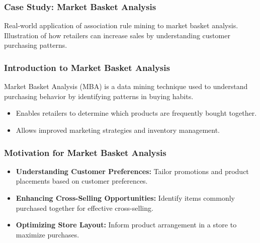 \documentclass[aspectratio=169]{beamer}
\begin{document}
\begin{frame}[fragile]
    \frametitle{Case Study: Market Basket Analysis}
    Real-world application of association rule mining to market basket analysis. 
    Illustration of how retailers can increase sales by understanding customer purchasing patterns.
\end{frame}

\begin{frame}[fragile]
    \frametitle{Introduction to Market Basket Analysis}
    Market Basket Analysis (MBA) is a data mining technique used to understand purchasing behavior by identifying patterns in buying habits.
    
    \begin{itemize}
        \item Enables retailers to determine which products are frequently bought together.
        \item Allows improved marketing strategies and inventory management.
    \end{itemize}
\end{frame}

\begin{frame}[fragile]
    \frametitle{Motivation for Market Basket Analysis}
    \begin{itemize}
        \item \textbf{Understanding Customer Preferences:} Tailor promotions and product placements based on customer preferences.
        \item \textbf{Enhancing Cross-Selling Opportunities:} Identify items commonly purchased together for effective cross-selling.
        \item \textbf{Optimizing Store Layout:} Inform product arrangement in a store to maximize purchases.
    \end{itemize}
\end{frame}
\end{document}
